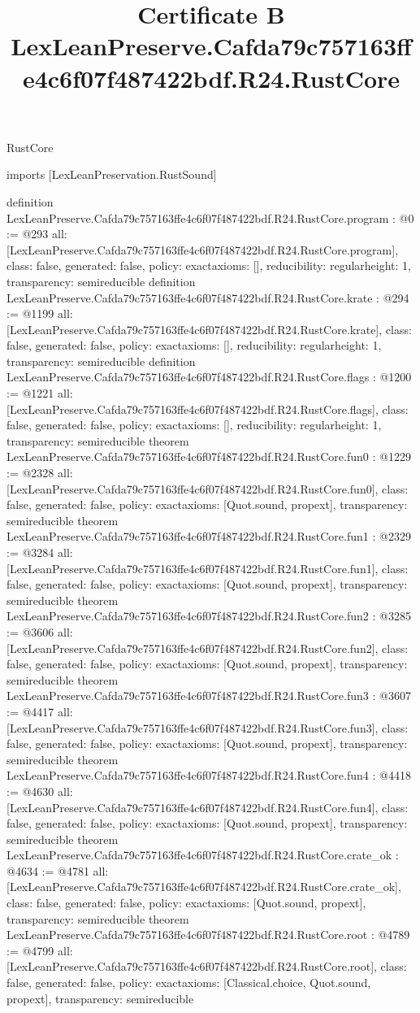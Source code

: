\begin{lexlean}{RustCore}
\title{Certificate B LexLeanPreserve.Cafda79c757163ffe4c6f07f487422bdf.R24.RustCore}
\begin{coremodule}
imports [LexLeanPreservation.RustSound]

definition LexLeanPreserve.Cafda79c757163ffe4c6f07f487422bdf.R24.RustCore.program : @0 := @293 {
  all: [LexLeanPreserve.Cafda79c757163ffe4c6f07f487422bdf.R24.RustCore.program],
  class: false,
  generated: false,
  policy: exact{axioms: []},
  reducibility: regular{height: 1},
  transparency: semireducible
}
definition LexLeanPreserve.Cafda79c757163ffe4c6f07f487422bdf.R24.RustCore.krate : @294 := @1199 {
  all: [LexLeanPreserve.Cafda79c757163ffe4c6f07f487422bdf.R24.RustCore.krate],
  class: false,
  generated: false,
  policy: exact{axioms: []},
  reducibility: regular{height: 1},
  transparency: semireducible
}
definition LexLeanPreserve.Cafda79c757163ffe4c6f07f487422bdf.R24.RustCore.flags : @1200 := @1221 {
  all: [LexLeanPreserve.Cafda79c757163ffe4c6f07f487422bdf.R24.RustCore.flags],
  class: false,
  generated: false,
  policy: exact{axioms: []},
  reducibility: regular{height: 1},
  transparency: semireducible
}
theorem LexLeanPreserve.Cafda79c757163ffe4c6f07f487422bdf.R24.RustCore.fun0 : @1229 := @2328 {
  all: [LexLeanPreserve.Cafda79c757163ffe4c6f07f487422bdf.R24.RustCore.fun0],
  class: false,
  generated: false,
  policy: exact{axioms: [Quot.sound, propext]},
  transparency: semireducible
}
theorem LexLeanPreserve.Cafda79c757163ffe4c6f07f487422bdf.R24.RustCore.fun1 : @2329 := @3284 {
  all: [LexLeanPreserve.Cafda79c757163ffe4c6f07f487422bdf.R24.RustCore.fun1],
  class: false,
  generated: false,
  policy: exact{axioms: [Quot.sound, propext]},
  transparency: semireducible
}
theorem LexLeanPreserve.Cafda79c757163ffe4c6f07f487422bdf.R24.RustCore.fun2 : @3285 := @3606 {
  all: [LexLeanPreserve.Cafda79c757163ffe4c6f07f487422bdf.R24.RustCore.fun2],
  class: false,
  generated: false,
  policy: exact{axioms: [Quot.sound, propext]},
  transparency: semireducible
}
theorem LexLeanPreserve.Cafda79c757163ffe4c6f07f487422bdf.R24.RustCore.fun3 : @3607 := @4417 {
  all: [LexLeanPreserve.Cafda79c757163ffe4c6f07f487422bdf.R24.RustCore.fun3],
  class: false,
  generated: false,
  policy: exact{axioms: [Quot.sound, propext]},
  transparency: semireducible
}
theorem LexLeanPreserve.Cafda79c757163ffe4c6f07f487422bdf.R24.RustCore.fun4 : @4418 := @4630 {
  all: [LexLeanPreserve.Cafda79c757163ffe4c6f07f487422bdf.R24.RustCore.fun4],
  class: false,
  generated: false,
  policy: exact{axioms: [Quot.sound, propext]},
  transparency: semireducible
}
theorem LexLeanPreserve.Cafda79c757163ffe4c6f07f487422bdf.R24.RustCore.crate_ok : @4634 := @4781 {
  all: [LexLeanPreserve.Cafda79c757163ffe4c6f07f487422bdf.R24.RustCore.crate_ok],
  class: false,
  generated: false,
  policy: exact{axioms: [Quot.sound, propext]},
  transparency: semireducible
}
theorem LexLeanPreserve.Cafda79c757163ffe4c6f07f487422bdf.R24.RustCore.root : @4789 := @4799 {
  all: [LexLeanPreserve.Cafda79c757163ffe4c6f07f487422bdf.R24.RustCore.root],
  class: false,
  generated: false,
  policy: exact{axioms: [Classical.choice, Quot.sound, propext]},
  transparency: semireducible
}


\end{coremodule}
\end{lexlean}
